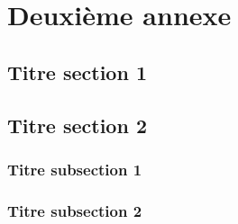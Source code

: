 \chapter{Deuxième annexe}

\fancyhead[LE]{\textsc{\chaptername~\thechapter}}

\section{Titre section 1}

\lipsum[4] 

\lipsum[5] 

\section{Titre section 2}

\lipsum[6]

\subsection{Titre subsection 1}

\lipsum[7]

\lipsum[8]

\lipsum[13]

\subsection{Titre subsection 2}

\lipsum[9]

\lipsum[10]

\lipsum[12]
